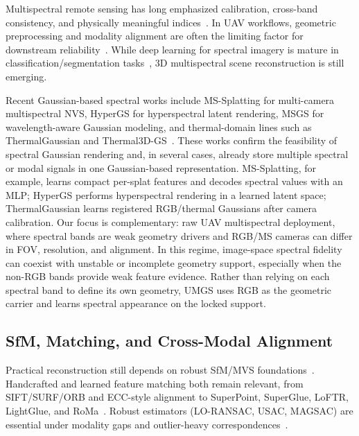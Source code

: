 Multispectral remote sensing has long emphasized calibration, cross-band consistency, and physically meaningful indices~\cite{goetz1985imaging,manolakis2016hyperspectral,rouse1974ndvi,gitelson1996gndvi,huete1988savi}. In UAV workflows, geometric preprocessing and modality alignment are often the limiting factor for downstream reliability~\cite{colomina2014uav,turner2014uav,zhang2019uavreview,mathews2018uav}. While deep learning for spectral imagery is mature in classification/segmentation tasks~\cite{audebert2019deep,li2020deepuav,paoletti2019deep,zhong2021deep}, 3D multispectral scene reconstruction is still emerging.

Recent Gaussian-based spectral works include MS-Splatting for multi-camera multispectral NVS, HyperGS for hyperspectral latent rendering, MSGS for wavelength-aware Gaussian modeling, and thermal-domain lines such as ThermalGaussian and Thermal3D-GS~\cite{meyerls2025mssplatting,thirgood2025hypergs,zhang2026msgs,lu2024thermalgaussian,chen2024thermal3dgs}. These works confirm the feasibility of spectral Gaussian rendering and, in several cases, already store multiple spectral or modal signals in one Gaussian-based representation. MS-Splatting, for example, learns compact per-splat features and decodes spectral values with an MLP; HyperGS performs hyperspectral rendering in a learned latent space; ThermalGaussian learns registered RGB/thermal Gaussians after camera calibration. Our focus is complementary: raw UAV multispectral deployment, where spectral bands are weak geometry drivers and RGB/MS cameras can differ in FOV, resolution, and alignment. In this regime, image-space spectral fidelity can coexist with unstable or incomplete geometry support, especially when the non-RGB bands provide weak feature evidence. Rather than relying on each spectral band to define its own geometry, UMGS uses RGB as the geometric carrier and learns spectral appearance on the locked support.

\subsection{SfM, Matching, and Cross-Modal Alignment}

Practical reconstruction still depends on robust SfM/MVS foundations~\cite{schoenberger2016sfm,schoenberger2016mvs,hartley2004multiple,fischler1981ransac}. Handcrafted and learned feature matching both remain relevant, from SIFT/SURF/ORB and ECC-style alignment to SuperPoint, SuperGlue, LoFTR, LightGlue, and RoMa~\cite{lowe2004sift,bay2008surf,rublee2011orb,evangelidis2008ecc,detone2018superpoint,sarlin2020superglue,sun2021loftr,lindenberger2023lightglue,edstedt2024roma}. Robust estimators (LO-RANSAC, USAC, MAGSAC) are essential under modality gaps and outlier-heavy correspondences~\cite{chum2003locally,raguram2013usac,barath2019magsac}.

